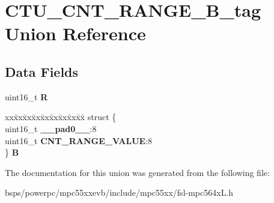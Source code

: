 \hypertarget{unionCTU__CNT__RANGE__16B__tag}{}\section{C\+T\+U\+\_\+\+C\+N\+T\+\_\+\+R\+A\+N\+G\+E\+\_\+B\+\_\+tag Union Reference}
\label{unionCTU__CNT__RANGE__16B__tag}
\subsection*{Data Fields}
\begin{DoxyCompactItemize}
\item 
\mbox{\label{unionCTU__CNT__RANGE__16B__tag_a8f3a34350a22fe7b74df1a21790a616f}} 
uint16\+\_\+t {\bfseries R}
\item 
\mbox{\label{unionCTU__CNT__RANGE__16B__tag_a26848432e8a989a847b07186b2fd4325}} 
\begin{tabbing}
xx\=xx\=xx\=xx\=xx\=xx\=xx\=xx\=xx\=\kill
struct \{\\
\>uint16\_t {\bfseries \_\_pad0\_\_}:8\\
\>uint16\_t {\bfseries CNT\_RANGE\_VALUE}:8\\
\} {\bfseries B}\\

\end{tabbing}\end{DoxyCompactItemize}


The documentation for this union was generated from the following file\+:\begin{DoxyCompactItemize}
\item 
bsps/powerpc/mpc55xxevb/include/mpc55xx/fsl-\/mpc564x\+L.\+h\end{DoxyCompactItemize}

